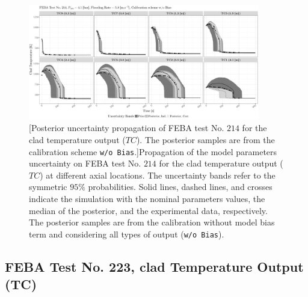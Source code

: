 \clearpage
\begin{figure}
	\centering
	\includegraphics[width=0.90\textwidth]{../figures/chapter5/figures/plotTraceUQPosteriorAllNoDiscNoBCTC214}
		[Posterior uncertainty propagation of FEBA test No. $214$ for the clad temperature output ($TC$). The posterior samples are from the calibration scheme \texttt{w/o Bias}.]{Propagation of the model parameters uncertainty on FEBA test No. $214$ for the clad temperature output ($TC$) at different axial locations. The uncertainty bands refer to the symmetric $95\%$ probabilities. Solid lines, dashed lines, and crosses indicate the simulation with the nominal parameters values, the median of the posterior, and the experimental data, respectively. The posterior samples are from the calibration without model bias term and considering all types of output (\texttt{w/o Bias}).}
	\label{fig:ch5_plot_trace_uq_post_tc_214_nodisc}
\end{figure}
\clearpage

\subsection{FEBA Test No. 223, clad Temperature Output (TC)}\label{app:tbl_results_uq_post_tc_223}

